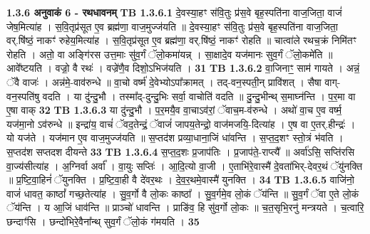 \documentclass[17pt]{extarticle}
\begin{document}
                \textbf{ 1.3.6      अनुवाकं   6 - रथधावनम्} \newline
                                \textbf{ TB 1.3.6.1} \newline
                  दे॒वस्या॒हꣳ स॑वि॒तुः प्र॑स॒वे बृह॒स्पति॑ना वाज॒जिता॒ वाजं॑ जेष॒मित्या॑ह । स॒वि॒तृप्र॑सूत ए॒व ब्रह्म॑णा॒ वाज॒मुज्ज॑यति ॥ दे॒वस्या॒हꣳ स॑वि॒तुः प्र॑स॒वे बृह॒स्पति॑ना वाज॒जिता॒ वर्.षि॑ष्ठं॒ नाकꣳ॑ रुहेय॒मित्या॑ह । स॒वि॒तृप्र॑सूत ए॒व ब्रह्म॑णा॒ वर्.षि॑ष्ठं॒ नाकꣳ॑ रोहति ॥ चात्वा॑ले रथच॒क्रं निमि॑तꣳ रोहति । अतो॒ वा अङ्गि॑रस उत्त॒माः सु॑व॒र्गं ॅलो॒कमा॑यन्न् । सा॒क्षादे॒व यज॑मानः सुव॒र्गं ॅलो॒कमे॑ति ॥ आवे᳚ष्टयति । वज्रो॒ वै रथः॑ । वज्रे॑णै॒व दिशो॒ऽभिज॑यति । \textbf{ 31} \newline
                  \newline
                                \textbf{ TB 1.3.6.2} \newline
                  वा॒जिनाꣳ॒॒ साम॑ गायते । अन्नं॒ ॅवै वाजः॑ । अन्न॑मे॒-वाव॑रुन्धे ॥ वा॒चो वर्ष्म॑ दे॒वेभ्योऽपा᳚क्रामत् । तद्-वन॒स्पती॒न् प्रावि॑शत् । सैषा वाग्-वन॒स्पति॑षु वदति । या दु॑न्दु॒भौ । तस्मा᳚द्-दुन्दु॒भिः सर्वा॒ वाचोति॑ वदति ॥ दु॒न्दु॒भीन्थ् स॒माघ्न॑न्ति । प॒र॒मा वा ए॒षा वाक् \textbf{ 32} \newline
                  \newline
                                \textbf{ TB 1.3.6.3} \newline
                  या दु॑न्दु॒भौ । प॒र॒मयै॒व वा॒चाऽव॑रां॒ ॅवाच॒म-व॑रुन्धे । अथो॑ वा॒च ए॒व वर्ष्म॒ यज॑मा॒नो ऽव॑रुन्धे ॥ इन्द्रा॑य॒ वाचं॑ ॅवद॒तेन्द्रं॒ ॅवाजं॑ जापय॒तेन्द्रो॒ वाज॑मजयि॒-दित्या॑ह । ए॒ष वा ए॒तर्.हीन्द्रः॑ । यो यज॑ते । यज॑मान ए॒व वाज॒मुज्ज॑यति ॥ स॒प्तद॑श प्रव्या॒धाना॒जिं धा॑वन्ति । स॒प्त॒द॒शꣳ स्तो॒त्रं भ॑वति । स॒प्तद॑श सप्तदश दीयन्ते \textbf{ 33} \newline
                  \newline
                                \textbf{ TB 1.3.6.4} \newline
                  स॒प्त॒द॒शः प्र॒जाप॑तिः । प्र॒जाप॑ते॒-राप्त्यै᳚ ॥ अर्वा॑ऽसि॒ सप्ति॑रसि वा॒ज्य॑सीत्या॑ह । अ॒ग्निर्वा अर्वा᳚ । वा॒युः सप्तिः॑ । आ॒दि॒त्यो वा॒जी । ए॒ताभि॑रे॒वास्मै॑ दे॒वता॑भिर्-देवर॒थं ॅयु॑नक्ति ॥ प्र॒ष्टि॒वा॒हिनं॑ ॅयुनक्ति । प्र॒ष्टि॒वा॒ही वै दे॑वर॒थः । दे॒व॒र॒थमे॒वास्मै॑ युनक्ति । \textbf{ 34} \newline
                  \newline
                                \textbf{ TB 1.3.6.5} \newline
                  वाजि॑नो॒ वाजं॑ धावत॒ काष्ठां᳚ गच्छ॒तेत्या॑ह । सु॒व॒र्गो वै लो॒कः काष्ठा᳚ । सु॒व॒र्गमे॒व लो॒कं ॅय॑न्ति ॥ सु॒व॒र्गं ॅवा ए॒ते लो॒कं ॅय॑न्ति । य आ॒जिं धाव॑न्ति ॥ प्राञ्चो॑ धावन्ति । प्राङि॑व॒ हि सु॑व॒र्गो लो॒कः ॥ च॒त॒सृभि॒रनु॑ मन्त्रयते । च॒त्वारि॒ छन्दाꣳ॑सि । छन्दो॑भिरे॒वैना᳚न्थ् सुव॒र्गं ॅलो॒कं ग॑मयति । \textbf{ 35} \newline
\end{document}
